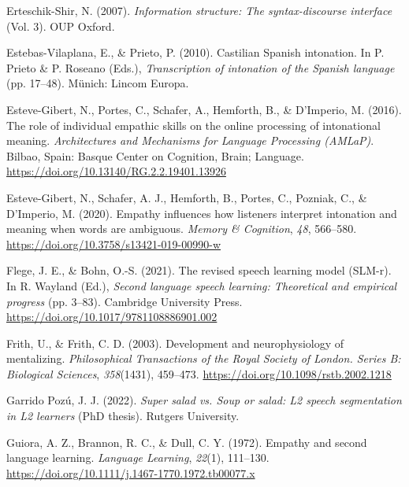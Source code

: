 \documentclass[]{article}
\newlength{\cslhangindent}
\newenvironment{CSLReferences}[2] %
 {%
  \setlength{\parindent}{0pt}
  \ifodd #1 \everypar{\setlength{\hangindent}{\cslhangindent}}\ignorespaces\fi
  \ifnum #2 > 0
  \setlength{\parskip}{#2\baselineskip}
  \fi
 }%
 {}
\begin{document}
\begin{CSLReferences}{1}{0}
\leavevmode{}%
Erteschik-Shir, N. (2007). \emph{Information structure: {T}he syntax-discourse interface} (Vol. 3). OUP Oxford.

\leavevmode{}%
Estebas-Vilaplana, E., \& Prieto, P. (2010). Castilian {S}panish intonation. In P. Prieto \& P. Roseano (Eds.), \emph{Transcription of intonation of the {S}panish language} (pp. 17--48). Münich: Lincom Europa.

\leavevmode{}%
Esteve-Gibert, N., Portes, C., Schafer, A., Hemforth, B., \& D'Imperio, M. (2016). The role of individual empathic skills on the online processing of intonational meaning. \emph{Architectures and Mechanisms for Language Processing (AMLaP)}. Bilbao, Spain: Basque Center on Cognition, Brain; Language. \url{https://doi.org/10.13140/RG.2.2.19401.13926}

\leavevmode{}%
Esteve-Gibert, N., Schafer, A. J., Hemforth, B., Portes, C., Pozniak, C., \& D'Imperio, M. (2020). Empathy influences how listeners interpret intonation and meaning when words are ambiguous. \emph{Memory \& Cognition}, \emph{48}, 566--580. \url{https://doi.org/10.3758/s13421-019-00990-w}

\leavevmode{}%
Flege, J. E., \& Bohn, O.-S. (2021). The revised speech learning model (SLM-r). In R. Wayland (Ed.), \emph{Second language speech learning: Theoretical and empirical progress} (pp. 3--83). Cambridge University Press. \url{https://doi.org/10.1017/9781108886901.002}

\leavevmode{}%
Frith, U., \& Frith, C. D. (2003). Development and neurophysiology of mentalizing. \emph{Philosophical Transactions of the Royal Society of London. Series B: Biological Sciences}, \emph{358}(1431), 459--473. \url{https://doi.org/10.1098/rstb.2002.1218}

\leavevmode{}%
Garrido Pozú, J. J. (2022). \emph{Super salad vs. Soup or salad: {L}2 speech segmentation in L2 learners} (PhD thesis). Rutgers University.

\leavevmode{}%
Guiora, A. Z., Brannon, R. C., \& Dull, C. Y. (1972). Empathy and second language learning. \emph{Language Learning}, \emph{22}(1), 111--130. \url{https://doi.org/10.1111/j.1467-1770.1972.tb00077.x}


\end{CSLReferences}
\end{document}
